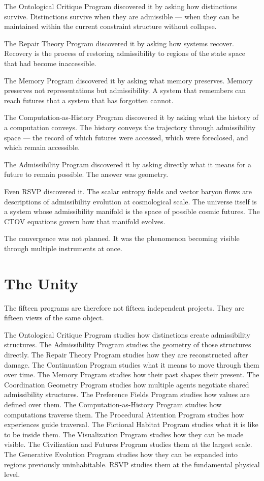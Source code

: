\documentclass[12pt, openany]{book}
\begin{document}
The Ontological Critique Program discovered it by asking how distinctions
survive. Distinctions survive when they are admissible — when they can be
maintained within the current constraint structure without collapse.

The Repair Theory Program discovered it by asking how systems recover.
Recovery is the process of restoring admissibility to regions of the state
space that had become inaccessible.

The Memory Program discovered it by asking what memory preserves. Memory
preserves not representations but admissibility. A system that remembers
can reach futures that a system that has forgotten cannot.

The Computation-as-History Program discovered it by asking what the history
of a computation conveys. The history conveys the trajectory through
admissibility space — the record of which futures were accessed, which were
foreclosed, and which remain accessible.

The Admissibility Program discovered it by asking directly what it means
for a future to remain possible. The answer was geometry.

Even RSVP discovered it. The scalar entropy fields and vector baryon flows
are descriptions of admissibility evolution at cosmological scale. The
universe itself is a system whose admissibility manifold is the space of
possible cosmic futures. The CTOV equations govern how that manifold evolves.

The convergence was not planned. It was the phenomenon becoming visible
through multiple instruments at once.

\section{The Unity}

The fifteen programs are therefore not fifteen independent projects. They
are fifteen views of the same object.

The Ontological Critique Program studies how distinctions create
admissibility structures. The Admissibility Program studies the geometry
of those structures directly. The Repair Theory Program studies how they
are reconstructed after damage. The Continuation Program studies what it
means to move through them over time. The Memory Program studies how their
past shapes their present. The Coordination Geometry Program studies how
multiple agents negotiate shared admissibility structures. The Preference
Fields Program studies how values are defined over them. The Computation-as-History
Program studies how computations traverse them. The Procedural Attention
Program studies how experiences guide traversal. The Fictional Habitat
Program studies what it is like to be inside them. The Visualization
Program studies how they can be made visible. The Civilization and Futures
Program studies them at the largest scale. The Generative Evolution Program
studies how they can be expanded into regions previously uninhabitable.
RSVP studies them at the fundamental physical level.
\end{document}
